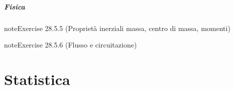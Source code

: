 \documentclass[letterpaper,10pt,italian]{jupyterBook}
\begin{document}
\subsubsection{Fisica}
\label{\detokenize{ch/vector-calculus/problems:fisica}} \label{exercise:ch/vector-calculus/problems-exercise-4}

\begin{sphinxadmonition}{note}{Exercise 28.5.5 (Proprietà inerziali \sphinxhyphen{} massa, centro di massa, momenti)}


\end{sphinxadmonition}
 \label{exercise:ch/vector-calculus/problems-exercise-5}

\begin{sphinxadmonition}{note}{Exercise 28.5.6 (Flusso e circuitazione)}


\end{sphinxadmonition}

\sphinxstepscope


\part{Statistica}

\sphinxstepscope
\end{document}
